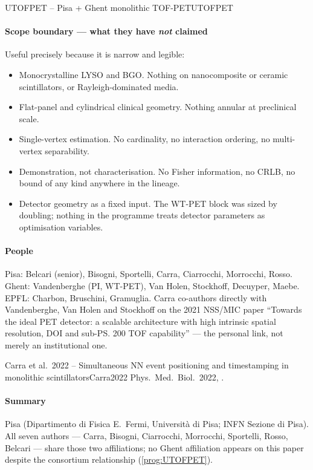 \begin{programnote}{UTOFPET -- Pisa + Ghent monolithic TOF-PET}{UTOFPET}
\paragraph{Scope boundary --- what they have \emph{not} claimed}
Useful precisely because it is narrow and legible:
\begin{itemize}
	\item Monocrystalline LYSO and BGO. Nothing on nanocomposite or ceramic
		scintillators, or Rayleigh-dominated media.
	\item Flat-panel and cylindrical clinical geometry. Nothing annular at
		preclinical scale.
	\item Single-vertex estimation. No cardinality, no interaction ordering,
		no multi-vertex separability. 
	\item Demonstration, not characterisation. No Fisher information, no CRLB,
		no bound of any kind anywhere in the lineage.
	\item Detector geometry as a fixed input. The WT-PET block was sized by
		doubling; nothing in the programme treats detector parameters as
		optimisation variables.
\end{itemize}

\paragraph{People}
Pisa: Belcari (senior), Bisogni, Sportelli, Carra, Ciarrocchi, Morrocchi, Rosso.
Ghent: Vandenberghe (PI, WT-PET), Van Holen, Stockhoff, Decuyper, Maebe.
EPFL: Charbon, Bruschini, Gramuglia.
Carra co-authors directly with Vandenberghe, Van Holen and Stockhoff on the 2021
NSS/MIC paper ``Towards the ideal PET detector: a scalable architecture with high
intrinsic spatial resolution, DOI and sub-\ps{200} TOF capability'' --- the
personal link, not merely an institutional one.

\begin{papernote}{Carra et al.\ 2022 -- Simultaneous NN event positioning and timestamping in monolithic scintillators}{Carra2022}
Phys.\ Med.\ Biol.\ 2022, .

\paragraph{Summary}
Pisa (Dipartimento di Fisica E.\ Fermi, Università di Pisa; INFN Sezione di
Pisa). All seven authors --- Carra, Bisogni, Ciarrocchi, Morrocchi, Sportelli,
Rosso, Belcari --- share those two affiliations; no Ghent affiliation appears on
this paper despite the consortium relationship (\ref{prog:UTOFPET}).


\end{papernote}
\end{programnote}
